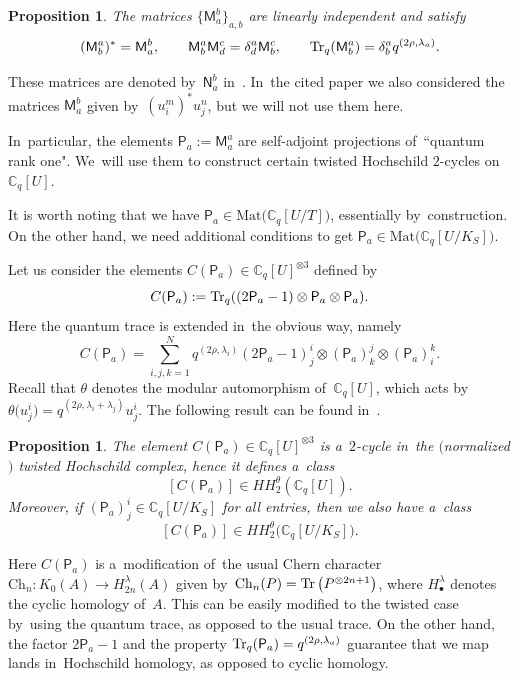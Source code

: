 \documentclass[10pt,a4paper]{amsart}
\numberwithin{equation}{section}
\newtheorem{Proposition}[Theorem]{Proposition}
 { \theoremstyle{definition}
\newtheorem{Definition}[Theorem]{Definition}
\newtheorem{Note}[Theorem]{Note}
\newtheorem{Example}[Theorem]{Example}
\newtheorem{Remark}[Theorem]{Remark} }
\newcommand{\CqU}{\mathbb{C}_q[U]}
\newcommand{\Cqflag}{\mathbb{C}_q[U / K_S]}
\newcommand{\Cqfullflag}{\mathbb{C}_q[U /T]}
\newcommand{\matuni}{\mathsf{M}}
\newcommand{\proj}{\mathsf{P}}
\begin{document}
\begin{Proposition}
\label{prop:matrix-units}
The matrices $\big\{\matuni^b_a\big\}_{a, b}$ are linearly independent and satisfy
\[
(\matuni^a_b)^* = \matuni^b_a, \qquad
\matuni^a_b \matuni^c_d = \delta^a_d \matuni^c_b, \qquad
\mathop{\rm Tr}\nolimits_q(\matuni^a_b) = \delta^a_b q^{(2 \rho, \lambda_a)}.
\]
\end{Proposition}

\begin{Remark}
These matrices are denoted by~$\mathsf{N}^b_a$ in~\cite{twist-hoch}.
In~the cited paper we also considered the matrices $\mathsf{M}^b_a$ given by~$(u^m_i)^* u^n_j$, but we will not use them here.
\end{Remark}

In~particular, the elements $\proj_a := \matuni^a_a$ are self-adjoint projections of~``quantum rank one".
We~will use them to construct certain twisted Hoch\-schild $2$-cycles on $\CqU$.

\begin{Remark}
It is worth noting that we have $\proj_a \in \mathrm{Mat}\big(\Cqfullflag\big)$, essentially by~construction.
On the other hand, we need additional conditions to get $\proj_a \in \mathrm{Mat}\big(\Cqflag\big)$.
\end{Remark}

Let us consider the elements $C(\proj_a) \in \CqU^{\otimes 3}$ defined by
\[
C(\proj_a) := \mathop{\rm Tr}\nolimits_q((2 \proj_a - 1) \otimes \proj_a \otimes \proj_a).
\]
Here the quantum trace is extended in~the obvious way, namely
\[
C(\proj_a) = \sum_{i, j, k = 1}^N q^{(2 \rho, \lambda_i)} (2 \proj_a - 1)^i_j \otimes (\proj_a)^j_k \otimes (\proj_a)^k_i.
\]
Recall that $\theta$ denotes the modular automorphism of~$\CqU$, which acts by~$\theta\big(u^i_j\big) = q^{(2 \rho, \lambda_i + \lambda_j)} u^i_j$.
The following result can be found in~\cite[Proposition~5.1]{twist-hoch}.

\begin{Proposition}
\label{prop:hoch-classes}
The element $C(\proj_a) \in \CqU^{\otimes 3}$ is a~$2$-cycle in~the $($normalized$)$ twisted Hoch\-schild complex, hence it defines a~class
\[
[C(\proj_a)] \in HH^\theta_2(\CqU).
\]
Moreover, if $(\proj_a)^i_j \in \Cqflag$ for all entries, then we also have a~class
\[
[C(\proj_a)] \in HH^\theta_2\big(\Cqflag\big).
\]
\end{Proposition}

\begin{Remark}
Here $C(\proj_a)$ is a~modification of~the usual Chern character $\mathrm{Ch}_n\colon K_0(A) \to H^\lambda_{2 n}(A)$ given by~$\mathrm{Ch}_n(P) = \mathop{\rm Tr}\big(P^{\otimes 2 n + 1}\big)$, where $H^\lambda_\bullet$ denotes the cyclic homology of~$A$.
This can be easily modified to the twisted case by~using the quantum trace, as opposed to the usual trace.
On the other hand, the factor $2 \proj_a - 1$ and the property $\mathop{\rm Tr}\nolimits_q(\proj_a) = q^{(2 \rho, \lambda_a)}$ guarantee that we map lands in~Hoch\-schild homology, as opposed to cyclic homology.
\end{Remark}
\end{document}
